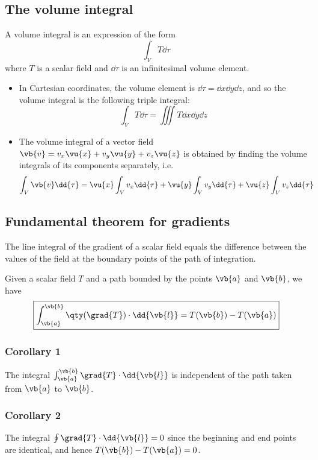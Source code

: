 	
		
	\subsection{The volume integral}
		A volume integral is an expression of the form
		$$\int_{V}{T\dd{\tau}}$$
		where $T$ is a scalar field and $\dd{\tau}$ is an infinitesimal volume element.
		\begin{itemize}
			\item In Cartesian coordinates, the volume element is $\dd{\tau}=\dd{x}\dd{y}\dd{z}$, and so the volume integral is the following triple integral:
			$$\int_{V}{T\dd{\tau}}=\iiint{T\dd{x}\dd{y}\dd{z}}$$
			\item The volume integral of a vector field $\vb{v}=v_x\vu{x}+v_y\vu{y}+v_z\vu{z}$ is obtained by finding the volume integrals of its components separately, i.e.
			\begin{align*}
				\int_{V}{\vb{v}\dd{\tau}}&=\vu{x}\int_{V}{v_x\dd{\tau}}+\vu{y}\int_{V}{v_y\dd{\tau}}+\vu{z}\int_{V}{v_z\dd{\tau}}
			\end{align*}
		\end{itemize}
		
	\subsection{Fundamental theorem for gradients}
		The line integral of the gradient of a scalar field equals the difference between the values of the field at the boundary points of the path of integration.
		
		Given a scalar field $T$ and a path bounded by the points $\vb{a}$ and $\vb{b}$, we have
		\begin{align*}
			\boxed{\int_{\vb{a}}^{\vb{b}}{\qty(\grad{T})\cdot\dd{\vb{l}}}=T(\vb{b})-T(\vb{a})}
		\end{align*}
		
		\subsubsection*{Corollary 1}
			The integral $\int_{\vb{a}}^{\vb{b}}{\grad{T}\cdot\dd{\vb{l}}}$ is independent of the path taken from $\vb{a}$ to $\vb{b}$.
		
		\subsubsection*{Corollary 2}
			The integral $\oint{\grad{T}\cdot\dd{\vb{l}}}=0$ since the beginning and end points are identical, and hence $T(\vb{b})-T(\vb{a})=0$.
	
